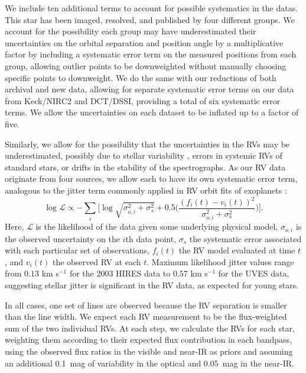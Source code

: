 We include ten additional terms to account for 
possible systematics in the datas. 
This star has been imaged, resolved, and published by four different groups.
We account for the possibility each group may have underestimated 
their uncertainties on the orbital separation and position angle
by a multiplicative factor by including a systematic error term on the measured positions 
from each group, allowing outlier points to be downweighted without manually choosing
specific points to downweight.
We do the same with our reductions of both archival and new data,
allowing for separate systematic error terms on our data from Keck/NIRC2 and 
DCT/DSSI, providing a total of six systematic error terms.
We allow the uncertainties on each dataset to be inflated up
to a factor of five.

Similarly, we allow for the possibility that the uncertainties in the 
RVs may be underestimated, possibly due to stellar variability \citep{Moulds13},
errors in systemic RVs of standard stars, or drifts in the stability of the
spectrographs.
As our RV data originate from four sources, we allow each to have its own 
systematic error term, analogous to the jitter term commonly applied 
in RV orbit fits of exoplanets \citep[e.g.][]{Johnson11b}:
\begin{equation}
\log \mathcal L \propto - \sum_i \bigg[\log{\sqrt{\sigma_{o,i}^2 + \sigma_s^2}} + 0.5 \bigg(\frac{(f_i(t) -
v_i(t))^2}{\sigma_{o,i}^2 + \sigma_s^2}\bigg)\bigg].
\end{equation}
Here, $\mathcal L$ is the likelihood of the data given some underlying physical model,
$\sigma_{o,i}$ is the observed uncertainty on the $i$th data point, $\sigma_s$ 
the systematic error associated with each particular set of observations, $f_i(t)$ the RV
model evaluated at time $t$, and $v_i(t)$ the observed RV at each $t$. 
Maximum likelihood jitter values range from $0.13$ km s$^{-1}$ for the 2003 HIRES data
to $0.57$ km s$^{-1}$ for the UVES data, suggesting stellar jitter is significant
in the RV data, as expected for young stars. 

In all cases, one set of lines are observed because the RV separation is smaller than
the line width.
We expect each RV measurement to be the flux-weighted sum of the two individual
RVs.
At each step, we calculate the RVs for each star, weighting them according to their 
expected flux contribution in each bandpass, using the observed flux ratios in the
visible and near-IR as priors and assuming an additional 0.1~mag of variability in 
the optical and 0.05~mag in the near-IR.

